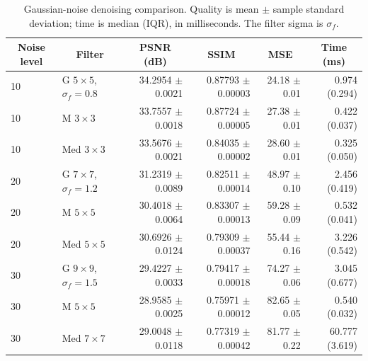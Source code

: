 \documentclass[a4paper,12pt]{article}
\begin{document}
\begin{table}[htbp]
\centering
\small
\setlength{\tabcolsep}{1.9pt}
\caption{Gaussian-noise denoising comparison. Quality is mean $\pm$ sample standard deviation; time is median (IQR), in milliseconds. The filter sigma is $\sigma_f$.}
\label{tab:a-gaussian}
\begin{tabular}{llrrrr}
\toprule
\multicolumn{1}{c}{Noise level} & \multicolumn{1}{c}{Filter} & \multicolumn{1}{c}{PSNR (dB)} & \multicolumn{1}{c}{SSIM} & \multicolumn{1}{c}{MSE} & \multicolumn{1}{c}{Time (ms)} \\
\midrule
10 & G $5\times 5$, $\sigma_f=0.8$ & 34.2954 $\pm$ 0.0021 & 0.87793 $\pm$ 0.00003 & 24.18 $\pm$ 0.01 & 0.974 (0.294) \\
10 & M $3\times 3$ & 33.7557 $\pm$ 0.0018 & 0.87724 $\pm$ 0.00005 & 27.38 $\pm$ 0.01 & 0.422 (0.037) \\
10 & Med $3\times 3$ & 33.5676 $\pm$ 0.0021 & 0.84035 $\pm$ 0.00002 & 28.60 $\pm$ 0.01 & 0.325 (0.050) \\
20 & G $7\times 7$, $\sigma_f=1.2$ & 31.2319 $\pm$ 0.0089 & 0.82511 $\pm$ 0.00014 & 48.97 $\pm$ 0.10 & 2.456 (0.419) \\
20 & M $5\times 5$ & 30.4018 $\pm$ 0.0064 & 0.83307 $\pm$ 0.00013 & 59.28 $\pm$ 0.09 & 0.532 (0.041) \\
20 & Med $5\times 5$ & 30.6926 $\pm$ 0.0124 & 0.79309 $\pm$ 0.00037 & 55.44 $\pm$ 0.16 & 3.226 (0.542) \\
30 & G $9\times 9$, $\sigma_f=1.5$ & 29.4227 $\pm$ 0.0033 & 0.79417 $\pm$ 0.00018 & 74.27 $\pm$ 0.06 & 3.045 (0.677) \\
30 & M $5\times 5$ & 28.9585 $\pm$ 0.0025 & 0.75971 $\pm$ 0.00012 & 82.65 $\pm$ 0.05 & 0.540 (0.032) \\
30 & Med $7\times 7$ & 29.0048 $\pm$ 0.0118 & 0.77319 $\pm$ 0.00042 & 81.77 $\pm$ 0.22 & 60.777 (3.619) \\
\bottomrule
\end{tabular}
\end{table}
\end{document}
